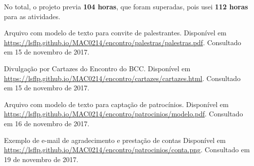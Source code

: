 \documentclass[12pt,letterpaper]{article}
\begin{document}
	No total, o projeto previa \textbf{104 horas}, que foram superadas, pois usei \textbf{112 horas} para as atividades.
	
	
	
	\begin{thebibliography}{1}
		
		Arquivo com modelo de texto para convite de palestrantes.
		\newblock Disponível em \url{https://lsflp.github.io/MAC0214/encontro/palestras/palestras.pdf}.
		\newblock Consultado em 15 de novembro de 2017.
		
		Divulgação por Cartazes do Encontro do BCC.
		\newblock Disponível em \url{https://lsflp.github.io/MAC0214/encontro/cartazes/cartazes.html}.
		\newblock Consultado em 15 de novembro de 2017.
		
		Arquivo com modelo de texto para captação de patrocínios.
		\newblock Disponível em \url{https://lsflp.github.io/MAC0214/encontro/patrocinios/modelo.pdf}.
		\newblock Consultado em 16 de novembro de 2017.

		Exemplo de e-mail de agradecimento e prestação de contas
		\newblock Disponível em \url{https://lsflp.github.io/MAC0214/encontro/patrocinios/conta.png}.
		\newblock Consultado em 19 de novembro de 2017.
		
	\end{thebibliography}
	
			 
\end{document}
